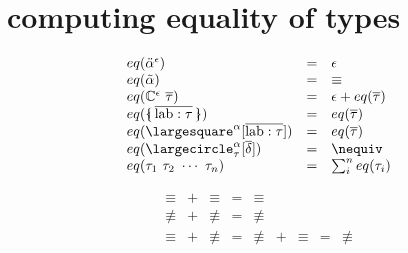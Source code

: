 \documentclass[11pt,a4paper]{article}
\newcommand{\nbkey}[1]{\textrm{#1}}
\newcommand{\record}[1]{\{\!\!\shortmid #1 \shortmid\!\!\}}
\newcommand{\overld}[3]{\largecircle^{#1}_{#2}{#3}}
\newcommand{\irecrd}[2]{\largesquare^{#1}{#2}}
\newcommand{\lab}{\nbkey{lab}}
\newcommand{\rigdvar}[1]{\ddot{#1}}
\newcommand{\flexvar}[1]{\tilde#1}
\newcommand{\tycon}{\mathbb{C}}
\newcommand{\type}{\tau}
\newcommand{\scheme}{\delta}
\newcommand{\equality}{\epsilon}
\newcommand{\eqyes}{\equiv}
\newcommand{\eqnot}{\nequiv}
\newcommand{\vect}[1]{\overline{#1}}
\begin{document}
\section {computing equality of types}
\begin{minipage}{0.7\textwidth}
\[\begin{array}{lcl}
eq(\rigdvar{\alpha}^\equality) 						&=& \equality \\
eq(\flexvar{\alpha})                                &=& \eqyes    \\
eq(\tycon^\equality\ \vect\type) 					&=& \equality + eq(\vect\type) \\
eq(\record{\vect{\lab:\type}})			        	&=& eq(\vect\type)    \\
eq(\irecrd{\alpha}{[\vect{\lab:\type}]})	    		&=& eq(\vect\type)    \\
eq(\overld{\alpha}{\type}{[\vect\scheme]})			&=& \eqnot                \\
eq(\type_1\ \type_2\ \cdots\ \type_n)			    &=& \sum_i^n eq(\type_i)  \\
\end{array}\]
\end{minipage}
\begin{minipage}{0.3\textwidth}
\[\begin{array}{ccccccccl}
\eqyes &+& \eqyes &=& \eqyes \\
\eqnot &+& \eqnot &=& \eqnot \\
\eqyes &+& \eqnot &=& \eqnot &+& \eqyes &=& \eqnot \\
\\ \\ \\ \\ \\
\end{array}\]
\end{minipage}
\end{document}
